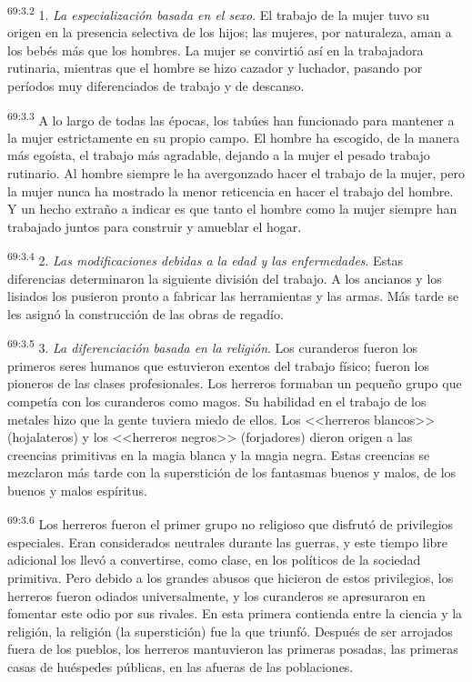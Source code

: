 \documentclass[twoside, 11pt]{book}
\begin{document}
\par
\textsuperscript{69:3.2} 1. \textit{La especialización basada en el sexo}. El trabajo de la mujer tuvo su origen en la presencia selectiva de los hijos; las mujeres, por naturaleza, aman a los bebés más que los hombres. La mujer se convirtió así en la trabajadora rutinaria, mientras que el hombre se hizo cazador y luchador, pasando por períodos muy diferenciados de trabajo y de descanso.

\par
\textsuperscript{69:3.3} A lo largo de todas las épocas, los tabúes han funcionado para mantener a la mujer estrictamente en su propio campo. El hombre ha escogido, de la manera más egoísta, el trabajo más agradable, dejando a la mujer el pesado trabajo rutinario. Al hombre siempre le ha avergonzado hacer el trabajo de la mujer, pero la mujer nunca ha mostrado la menor reticencia en hacer el trabajo del hombre. Y un hecho extraño a indicar es que tanto el hombre como la mujer siempre han trabajado juntos para construir y amueblar el hogar.

\par
\textsuperscript{69:3.4} 2. \textit{Las modificaciones debidas a la edad y las enfermedades}. Estas diferencias determinaron la siguiente división del trabajo. A los ancianos y los lisiados los pusieron pronto a fabricar las herramientas y las armas. Más tarde se les asignó la construcción de las obras de regadío.

\par
\textsuperscript{69:3.5} 3. \textit{La diferenciación basada en la religión}. Los curanderos fueron los primeros seres humanos que estuvieron exentos del trabajo físico; fueron los pioneros de las clases profesionales. Los herreros formaban un pequeño grupo que competía con los curanderos como magos. Su habilidad en el trabajo de los metales hizo que la gente tuviera miedo de ellos. Los <<herreros blancos>> (hojalateros) y los <<herreros negros>> (forjadores) dieron origen a las creencias primitivas en la magia blanca y la magia negra. Estas creencias se mezclaron más tarde con la superstición de los fantasmas buenos y malos, de los buenos y malos espíritus.

\par
\textsuperscript{69:3.6} Los herreros fueron el primer grupo no religioso que disfrutó de privilegios especiales. Eran considerados neutrales durante las guerras, y este tiempo libre adicional los llevó a convertirse, como clase, en los políticos de la sociedad primitiva. Pero debido a los grandes abusos que hicieron de estos privilegios, los herreros fueron odiados universalmente, y los curanderos se apresuraron en fomentar este odio por sus rivales. En esta primera contienda entre la ciencia y la religión, la religión (la superstición) fue la que triunfó. Después de ser arrojados fuera de los pueblos, los herreros mantuvieron las primeras posadas, las primeras casas de huéspedes públicas, en las afueras de las poblaciones.
\end{document}
